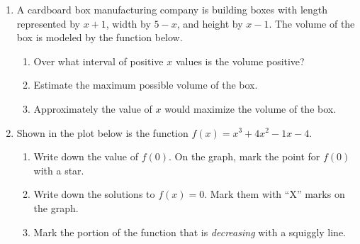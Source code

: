 \documentclass[12pt, twoside]{article}
\begin{document}
\begin{enumerate}
\newpage
\item A cardboard box manufacturing company is building boxes with length represented by $x+1$, width by $5-x$, and height by $x-1$. The volume of the box is modeled by the function below.
\begin{multicols}{2}
\begin{enumerate}[itemsep=0.75cm]
    \item Over what interval of positive $x$ values is the volume positive?
    \item Estimate the maximum possible volume of the box.
    \item Approximately the value of $x$ would maximize the volume of the box.
\end{enumerate} 
\end{multicols}

\item Shown in the plot below is the function $f(x)=x^3+4x^2-1x-4$.
\begin{enumerate}
    \item Write down the value of $f(0)$. On the graph, mark the point for $f(0)$ with a star.\vspace{0.75cm}
    \item Write down the solutions to $f(x)=0$. Mark them with ``X'' marks on the graph.\vspace{0.75cm}
    \item Mark the portion of the function that is \emph{decreasing} with a squiggly line.
\end{enumerate}
\begin{center}
\end{center}

\end{enumerate}
\end{document}
